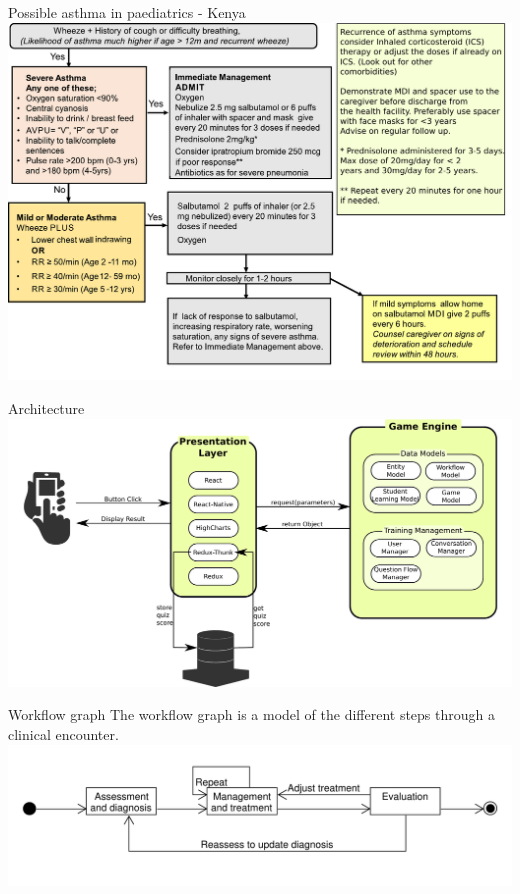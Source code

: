 \documentclass{beamer}
\begin{document}
\begin{frame}{Possible asthma in paediatrics - Kenya}
\includegraphics[scale=0.45]{KenyaCPG}
\end{frame}

\begin{frame}{Architecture}
\includegraphics[scale=0.35]{Architecture}
\end{frame}

\begin{frame}{Workflow graph}
The workflow graph is a model of the different steps through a clinical encounter.
\includegraphics[scale=0.44]{WorkflowGraph}
\end{frame}
\end{document}
